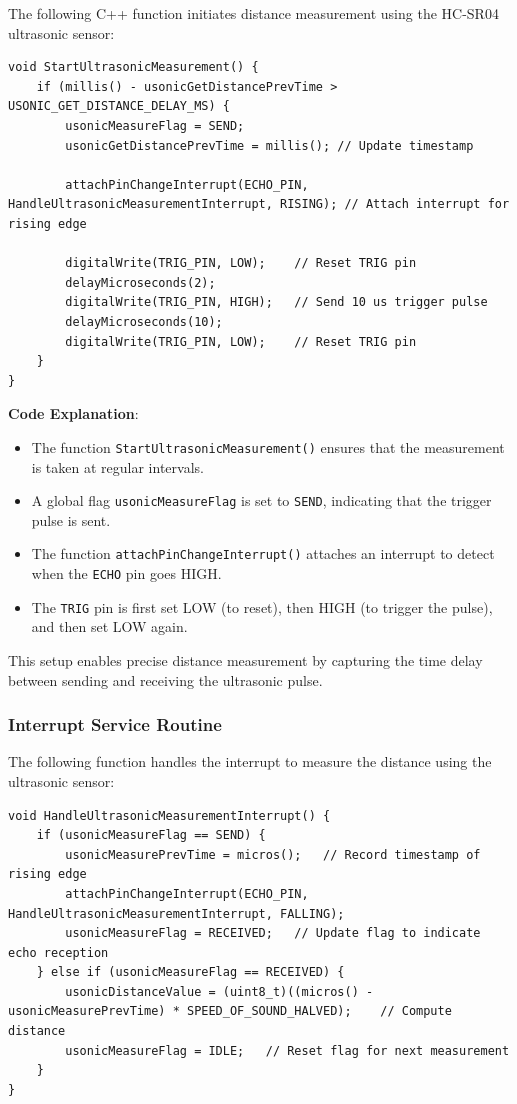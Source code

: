 The following C++ function initiates distance measurement using the HC-SR04 ultrasonic sensor:
\begin{lstlisting}[style=cppstyle2]
void StartUltrasonicMeasurement() {
	if (millis() - usonicGetDistancePrevTime > USONIC_GET_DISTANCE_DELAY_MS) {
		usonicMeasureFlag = SEND;
		usonicGetDistancePrevTime = millis(); // Update timestamp
		
		attachPinChangeInterrupt(ECHO_PIN, HandleUltrasonicMeasurementInterrupt, RISING); // Attach interrupt for rising edge
		
		digitalWrite(TRIG_PIN, LOW); 	// Reset TRIG pin
		delayMicroseconds(2);
		digitalWrite(TRIG_PIN, HIGH); 	// Send 10 us trigger pulse
		delayMicroseconds(10);
		digitalWrite(TRIG_PIN, LOW); 	// Reset TRIG pin
	}
}
\end{lstlisting}
\textbf{Code Explanation}:
\begin{itemize}
	\item The function \texttt{StartUltrasonicMeasurement()} ensures that the measurement is taken at regular intervals.
	\item A global flag \texttt{usonicMeasureFlag} is set to \texttt{SEND}, indicating that the trigger pulse is sent.
	\item The function \texttt{attachPinChangeInterrupt()} attaches an interrupt to detect when the \texttt{ECHO} pin goes HIGH.
	\item The \texttt{TRIG} pin is first set LOW (to reset), then HIGH (to trigger the pulse), and then set LOW again.
\end{itemize}
This setup enables precise distance measurement by capturing the time delay between sending and receiving the ultrasonic pulse.


\subsubsection{Interrupt Service Routine}
The following function handles the interrupt to measure the distance using the ultrasonic sensor:

\begin{lstlisting}[style=cppstyle2]
void HandleUltrasonicMeasurementInterrupt() {
	if (usonicMeasureFlag == SEND) {
		usonicMeasurePrevTime = micros();	// Record timestamp of rising edge
		attachPinChangeInterrupt(ECHO_PIN, HandleUltrasonicMeasurementInterrupt, FALLING);
		usonicMeasureFlag = RECEIVED; 	// Update flag to indicate echo reception
	} else if (usonicMeasureFlag == RECEIVED) {
		usonicDistanceValue = (uint8_t)((micros() - usonicMeasurePrevTime) * SPEED_OF_SOUND_HALVED);	// Compute distance
		usonicMeasureFlag = IDLE;	// Reset flag for next measurement
	}
}
\end{lstlisting}

